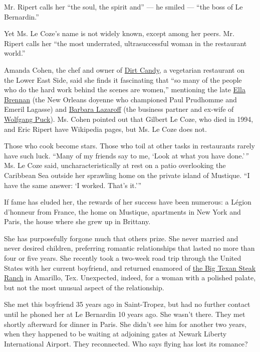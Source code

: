 Mr. Ripert calls her ``the soul, the spirit and'' --- he smiled ---
``the boss of Le Bernardin.''

Yet Ms. Le Coze's name is not widely known, except among her peers. Mr.
Ripert calls her ``the most underrated, ultrasuccessful woman in the
restaurant world.''

Amanda Cohen, the chef and owner of
\href{https://www.nytimes3xbfgragh.onion/2012/11/28/dining/reviews/restaurant-review-dirt-candy-in-the-east-village.html}{Dirt
Candy}, a vegetarian restaurant on the Lower East Side, said she finds
it fascinating that ``so many of the people who do the hard work behind
the scenes are women,'' mentioning the late
\href{https://www.nytimes3xbfgragh.onion/2018/06/01/obituaries/ella-brennan-grande-dame-restaurateur-of-new-orleans-dies-at-92.html}{Ella
Brennan} (the New Orleans doyenne who championed Paul Prudhomme and
Emeril Lagasse) and \href{http://www.barbaralazaroff.com/}{Barbara
Lazaroff} (the business partner and ex-wife of
\href{https://www.nytimes3xbfgragh.onion/2012/10/31/dining/wolfgang-puck-the-original-celebrity-chef-is-still-keeping-busy.html}{Wolfgang
Puck}). Ms. Cohen pointed out that Gilbert Le Coze, who died in 1994,
and Eric Ripert have Wikipedia pages, but Ms. Le Coze does not.

Those who cook become stars. Those who toil at other tasks in
restaurants rarely have such luck. ``Many of my friends say to me, `Look
at what you have done.'\emph{''} Ms. Le Coze said, uncharacteristically
at rest on a patio overlooking the Caribbean Sea outside her sprawling
home on the private island of Mustique. ``I have the same answer: `I
worked. That's it.'''

If fame has eluded her, the rewards of her success have been numerous: a
Légion d'honneur from France, the home on Mustique, apartments in New
York and Paris, the house where she grew up in Brittany.

She has purposefully forgone much that others prize. She never married
and never desired children, preferring romantic relationships that
lasted no more than four or five years. She recently took a two-week
road trip through the United States with her current boyfriend, and
returned enamored of \href{https://www.bigtexan.com/}{the Big Texan
Steak Ranch} in Amarillo, Tex. Unexpected, indeed, for a woman with a
polished palate, but not the most unusual aspect of the relationship.

She met this boyfriend 35 years ago in Saint-Tropez, but had no further
contact until he phoned her at Le Bernardin 10 years ago. She wasn't
there. They met shortly afterward for dinner in Paris. She didn't see
him for another two years, when they happened to be waiting at adjoining
gates at Newark Liberty International Airport. They reconnected. Who
says flying has lost its romance?

